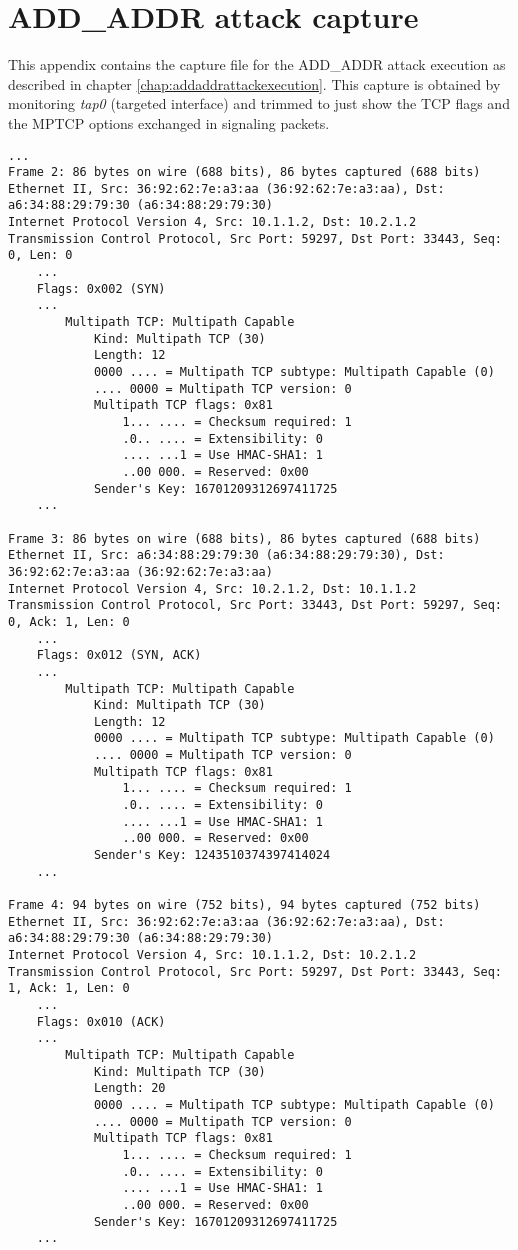 \chapter{ADD\_ADDR attack capture}
\label{app:a}

This appendix contains the capture file for the ADD\_ADDR attack execution as described in chapter \ref{chap:addaddrattackexecution}. This capture is obtained by monitoring \textit{tap0} (targeted interface) and trimmed to just show the TCP flags and the MPTCP options exchanged in signaling packets.

\begingroup
    \fontsize{8pt}{9pt}\selectfont
	\begin{verbatim}
...
Frame 2: 86 bytes on wire (688 bits), 86 bytes captured (688 bits)
Ethernet II, Src: 36:92:62:7e:a3:aa (36:92:62:7e:a3:aa), Dst: a6:34:88:29:79:30 (a6:34:88:29:79:30)
Internet Protocol Version 4, Src: 10.1.1.2, Dst: 10.2.1.2
Transmission Control Protocol, Src Port: 59297, Dst Port: 33443, Seq: 0, Len: 0
    ...
    Flags: 0x002 (SYN)
    ...
        Multipath TCP: Multipath Capable
            Kind: Multipath TCP (30)
            Length: 12
            0000 .... = Multipath TCP subtype: Multipath Capable (0)
            .... 0000 = Multipath TCP version: 0
            Multipath TCP flags: 0x81
                1... .... = Checksum required: 1
                .0.. .... = Extensibility: 0
                .... ...1 = Use HMAC-SHA1: 1
                ..00 000. = Reserved: 0x00
            Sender's Key: 16701209312697411725
    ...

Frame 3: 86 bytes on wire (688 bits), 86 bytes captured (688 bits)
Ethernet II, Src: a6:34:88:29:79:30 (a6:34:88:29:79:30), Dst: 36:92:62:7e:a3:aa (36:92:62:7e:a3:aa)
Internet Protocol Version 4, Src: 10.2.1.2, Dst: 10.1.1.2
Transmission Control Protocol, Src Port: 33443, Dst Port: 59297, Seq: 0, Ack: 1, Len: 0
    ...
    Flags: 0x012 (SYN, ACK)
    ...
        Multipath TCP: Multipath Capable
            Kind: Multipath TCP (30)
            Length: 12
            0000 .... = Multipath TCP subtype: Multipath Capable (0)
            .... 0000 = Multipath TCP version: 0
            Multipath TCP flags: 0x81
                1... .... = Checksum required: 1
                .0.. .... = Extensibility: 0
                .... ...1 = Use HMAC-SHA1: 1
                ..00 000. = Reserved: 0x00
            Sender's Key: 1243510374397414024
    ...

Frame 4: 94 bytes on wire (752 bits), 94 bytes captured (752 bits)
Ethernet II, Src: 36:92:62:7e:a3:aa (36:92:62:7e:a3:aa), Dst: a6:34:88:29:79:30 (a6:34:88:29:79:30)
Internet Protocol Version 4, Src: 10.1.1.2, Dst: 10.2.1.2
Transmission Control Protocol, Src Port: 59297, Dst Port: 33443, Seq: 1, Ack: 1, Len: 0
    ...
    Flags: 0x010 (ACK)
    ...
        Multipath TCP: Multipath Capable
            Kind: Multipath TCP (30)
            Length: 20
            0000 .... = Multipath TCP subtype: Multipath Capable (0)
            .... 0000 = Multipath TCP version: 0
            Multipath TCP flags: 0x81
                1... .... = Checksum required: 1
                .0.. .... = Extensibility: 0
                .... ...1 = Use HMAC-SHA1: 1
                ..00 000. = Reserved: 0x00
            Sender's Key: 16701209312697411725
    ...


\end{verbatim}
